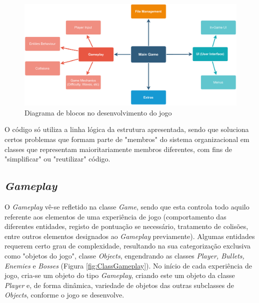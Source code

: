 \documentclass[a4paper,11pt]{article}
\begin{document}
\vspace{8pt}

\begin{figure}[H]
    \centering
    \includegraphics[scale = 0.50]{2 - Esquemas/GameModulesDiagram.pdf}
    \caption{Diagrama de blocos no desenvolvimento do jogo}
    \label{fig:GameModulesDiagram}
\end{figure}

\vspace{8pt}

O código só utiliza a linha lógica da estrutura apresentada, sendo que soluciona certos problemas que formam parte de "membros" do sistema organizacional em classes que representam maioritariamente membros diferentes, com fins de "simplificar" ou "reutilizar" código.

\vspace{8pt}

\subsection*{\textit{Gameplay}}

\vspace{8pt}

O \textit{Gameplay} vê-se refletido na classe \textit{Game}, sendo que esta controla todo aquilo referente aos elementos de uma experiência de jogo (comportamento das diferentes entidades, registo de pontuação se necessário, tratamento de colisões, entre outros elementos designados ao \textit{Gameplay} previamente). Algumas entidades requerem certo grau de complexidade, resultando na sua categorização exclusiva como "objetos do jogo", classe \textit{Objects}, engendrando as classes \textit{Player, Bullets, Enemies} e \textit{Bosses} (Figura \ref{fig:ClassGameplay}). No início de cada experiência de jogo, cria-se um objeto do tipo \textit{Gameplay}, criando este um objeto da classe \textit{Player} e, de forma dinâmica, variedade de objetos das outras subclasses de \textit{Objects}, conforme o jogo se desenvolve.
\end{document}
